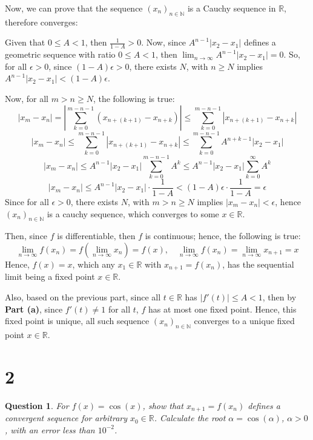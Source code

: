 \documentclass{article}
\newtheorem{question}{Question}
\begin{document}
\begin{itemize}
    \hfil

    Now, we can prove that the sequence $(x_n)_{n\in\mathbb{N}}$ is a Cauchy sequence in $\mathbb{R}$, therefore converges:

    Given that $0\leq A<1$, then $\frac{1}{1-A}>0$. Now, since $A^{n-1}|x_2-x_1|$ defines a geometric sequence with ratio $0\leq A<1$,
    then $\lim_{n\rightarrow\infty}A^{n-1}|x_2-x_1|=0$. So, for all $\epsilon>0$, since $(1-A)\epsilon>0$, there exists $N$,
    with $n\geq N$ implies $A^{n-1}|x_2-x_1|<(1-A)\epsilon$.

    Now, for all $m>n\geq N$, the following is true:
    $$|x_m-x_n| = \left|\sum_{k=0}^{m-n-1}(x_{n+(k+1)}-x_{n+k})\right| \leq \sum_{k=0}^{m-n-1}|x_{n+(k+1)}-x_{n+k}|$$
    $$|x_m-x_n|\leq \sum_{k=0}^{m-n-1}|x_{n+(k+1)}-x_{n+k}| \leq \sum_{k=0}^{m-n-1}A^{n+k-1}|x_2-x_1|$$
    $$|x_m-x_n|\leq A^{n-1}|x_2-x_1|\sum_{k=0}^{m-n-1}A^{k} \leq A^{n-1}|x_2-x_1|\sum_{k=0}^{\infty}A^k$$
    $$|x_m-x_n|\leq A^{n-1}|x_2-x_1|\cdot\frac{1}{1-A} < (1-A)\epsilon \cdot \frac{1}{1-A} = \epsilon$$
    Since for all $\epsilon>0$, there exists $N$, with $m>n\geq N$ implies $|x_m-x_n|<\epsilon$, hence $(x_n)_{n\in\mathbb{N}}$ is a cauchy sequence,
    which converges to some $x\in \mathbb{R}$.

    Then, since $f$ is differentiable, then $f$ is continuous; hence, the following is true:
    $$\lim_{n\rightarrow\infty}f(x_n)=f\left(\lim_{n\rightarrow\infty}x_n\right)=f(x),\quad \lim_{n\rightarrow\infty}f(x_n)=\lim_{n\rightarrow\infty}x_{n+1}=x$$
    Hence, $f(x)=x$, which any $x_1\in\mathbb{R}$ with $x_{n+1}=f(x_n)$, has the sequential limit being a fixed point $x\in\mathbb{R}$.

    Also, based on the previous part, since all $t\in\mathbb{R}$ has $|f'(t)|\leq A<1$, then by \textbf{Part (a)}, since $f'(t)\neq 1$ for all $t$, $f$ has at most one fixed point.
    Hence, this fixed point is unique, all such sequence $(x_n)_{n\in\mathbb{N}}$ converges to a unique fixed point $x\in\mathbb{R}$.
\end{itemize}

\break

\section*{2}
\begin{myBox}[]{}
    \begin{question}
        For $f(x) = \cos(x)$, show that $x_{n+1}=f(x_n)$ defines a convergent sequence
        for arbitrary $x_0\in\mathbb{R}$. Calculate the root $\alpha=\cos(\alpha)$, $\alpha>0$, with an error less than
        $10^{-2}$.
    \end{question}
\end{myBox}
\end{document}
